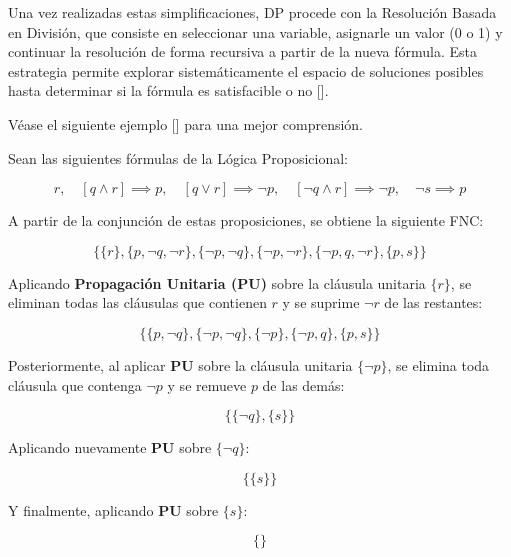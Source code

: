 Una vez realizadas estas simplificaciones, DP procede con la Resolución Basada en División, que consiste en seleccionar una variable, asignarle un valor (0 o 1) y continuar la resolución de forma recursiva a partir de la nueva fórmula. Esta estrategia permite explorar sistemáticamente el espacio de soluciones posibles hasta determinar si la fórmula es satisfacible o no [\cite{garcia-satcap}].

V\'ease el siguiente ejemplo [\cite{garcia-satcap}] para una mejor comprensi\'on.

Sean las siguientes fórmulas de la Lógica Proposicional:

\begin{equation*}
    r, \quad [q \land r] \implies p, \quad [q \lor r] \implies \neg p, \quad [\neg q \land r] \implies \neg p, \quad \neg s \implies p
\end{equation*}

A partir de la conjunción de estas proposiciones, se obtiene la siguiente FNC:

\begin{equation*}
    \{\{r\}, \{p,\neg q, \neg r\}, \{\neg p, \neg q\}, \{\neg p, \neg r\}, \{\neg p, q, \neg r\}, \{p, s\}\}
\end{equation*}

Aplicando \textbf{Propagación Unitaria (PU)} sobre la cláusula unitaria $\{r\}$, se eliminan todas las cláusulas que contienen $r$ y se suprime $\neg r$ de las restantes:

\begin{equation*}
    \{\{p,\neg q\}, \{\neg p,\neg q\}, \{\neg p\}, \{\neg p,q\}, \{p,s\}\}
\end{equation*}

Posteriormente, al aplicar \textbf{PU} sobre la cláusula unitaria $\{\neg p\}$, se elimina toda cláusula que contenga $\neg p$ y se remueve $p$ de las demás:

\begin{equation*}
    \{\{\neg q\}, \{s\}\}
\end{equation*}

Aplicando nuevamente \textbf{PU} sobre $\{\neg q\}$:

\begin{equation*}
    \{\{s\}\}
\end{equation*}

Y finalmente, aplicando \textbf{PU} sobre $\{s\}$:

\begin{equation*}
    \{\}
\end{equation*}

